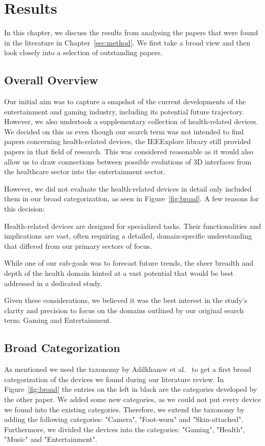 \section{Results}
\label{sec:results}

In this chapter, we discuss the results from analysing the papers that were found in the literature in Chapter~\ref{sec:method}. We first take a broad view and then look closely into a selection of outstanding papers.


\subsection{Overall Overview}
\label{qual_res}

Our initial aim was to capture a snapshot of the current developments of the entertainment and gaming industry, including its potential future trajectory. However, we also undertook a supplementary collection of health-related devices. We decided on this as even though our search term was not intended to find papers concerning health-related devices, the IEEExplore library still provided papers in that field of research. This was considered reasonable as it would also allow us to draw connections between possible evolutions of 3D interfaces from the healthcare sector into the entertainment sector.

However, we did not evaluate the health-related devices in detail only included them in our broad categorization, as seen in Figure~\ref{fig:broad}. A few reasons for this decision:

Health-related devices are designed for specialized tasks. Their functionalities and implications are vast, often requiring a detailed, domain-specific understanding that differed from our primary sectors of focus.

While one of our sub-goals was to forecast future trends, the sheer breadth and depth of the health domain hinted at a vast potential that would be best addressed in a dedicated study.

Given these considerations, we believed it was the best interest in the study's clarity and precision to focus on the domains outlined by our original search term: Gaming and Entertainment. 


\subsection{Broad Categorization}
\label{ss: broad}
As mentioned we used the taxonomy by Adilkhanov et al.~\cite{Adilkhanov22} to get a first broad categorization of the devices we found during our literature review. In Figure~\ref{fig:broad} the entries on the left in black are the categories developed by the other paper. We added some new categories, as we could not put every device we found into the existing categories. Therefore, we extend the taxonomy by adding the following categories: "Camera", "Foot-worn" and "Skin-attached". Furthermore, we divided the devices into the categories: "Gaming", "Health", "Music" and "Entertainment". 

